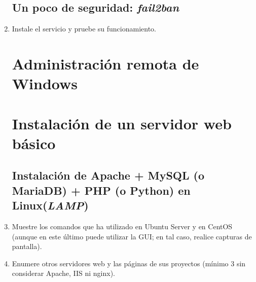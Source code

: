 \documentclass[paper=a4, fontsize=11pt]{scrartcl} %
\numberwithin{equation}{section} %
\numberwithin{figure}{section} %
\numberwithin{table}{section} %
\begin{document}
\begin{enumerate}
	\subsection{Un poco de seguridad: \textit{fail2ban}}
		\item Instale el servicio y pruebe su funcionamiento.
	
	\section{Administración remota de Windows}
	\section{Instalación de un servidor web básico}
	\subsection{Instalación de Apache + MySQL (o MariaDB) + PHP (o Python) en Linux(\textit{LAMP})}
		\item Muestre los comandos que ha utilizado en Ubuntu Server y en CentOS (aunque en este último
		puede utilizar la GUI; en tal caso, realice capturas de pantalla).
		
		
		\item Enumere otros servidores web y las páginas de sus proyectos (mínimo 3 sin considerar
		Apache, IIS ni nginx).
		
	

\end{enumerate}
\end{document}
